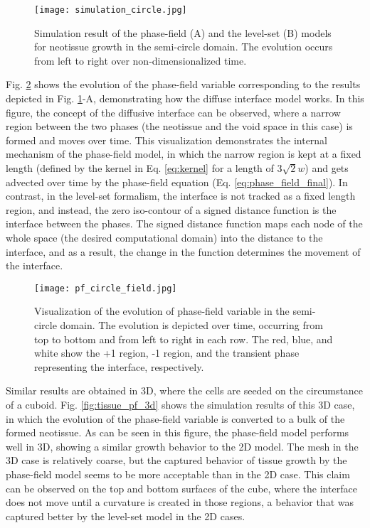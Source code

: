 \begin{figure}
\centering
\medskip
\texttt{[image: simulation\_circle.jpg]}
\caption[Simulation result of neotissue growth in the semi-circle domain]{Simulation result of the phase-field (A) and the level-set (B) models for neotissue growth in the semi-circle domain. The evolution occurs from left to right over non-dimensionalized time.}
\label{fig:tissue_simulation_circle}
\end{figure}

Fig. \ref{fig:tissue_pf_circle_field} shows the evolution of the phase-field variable corresponding to the results depicted in Fig. \ref{fig:tissue_simulation_circle}-A, demonstrating how the diffuse interface model works. In this figure, the concept of the diffusive interface can be observed, where a narrow region between the two phases (the neotissue and the void space in this case) is formed and moves over time. This visualization demonstrates the internal mechanism of the phase-field model, in which the narrow region is kept at a fixed length (defined by the kernel in Eq. \ref{eq:kernel} for a length of $3 \sqrt{2} w$) and gets advected over time by the phase-field equation (Eq. \ref{eq:phase_field_final}). In contrast, in the level-set formalism, the interface is not tracked as a fixed length region, and instead, the zero iso-contour of a signed distance function is the interface between the phases. The signed distance function maps each node of the whole space (the desired computational domain) into the distance to the interface, and as a result, the change in the function determines the movement of the interface.


\begin{figure}
\centering
\medskip
\texttt{[image: pf\_circle\_field.jpg]}
\caption[Visualization of the evolution of phase-field variable in the semi-circle domain]{Visualization of the evolution of phase-field variable in the semi-circle domain. The evolution is depicted over time, occurring from top to bottom and from left to right in each row. The red, blue, and white show the +1 region, -1 region, and the transient phase representing the interface, respectively.}
\label{fig:tissue_pf_circle_field}
\end{figure}

Similar results are obtained in 3D, where the cells are seeded on the circumstance of a cuboid. Fig. \ref{fig:tissue_pf_3d} shows the simulation results of this 3D case, in which the evolution of the phase-field variable is converted to a bulk of the formed neotissue. As can be seen in this figure, the phase-field model performs well in 3D, showing a similar growth behavior to the 2D model. The mesh in the 3D case is relatively coarse, but the captured behavior of tissue growth by the phase-field model seems to be more acceptable than in the 2D case. This claim can be observed on the top and bottom surfaces of the cube, where the interface does not move until a curvature is created in those regions, a behavior that was captured better by the level-set model in the 2D cases.

